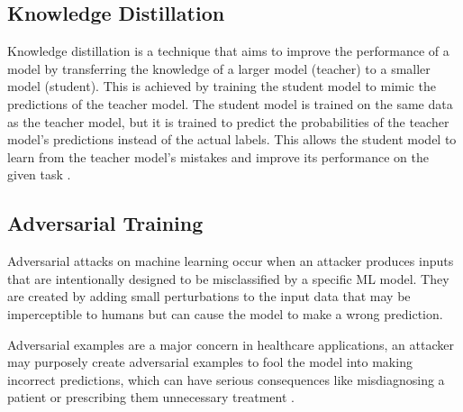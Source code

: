 \documentclass[../main.tex]{subfiles}
\begin{document}
     \subsection{Knowledge Distillation} \label{sec:knowledge_distillation} 

    Knowledge distillation is a technique that aims to improve the performance of a model by transferring the knowledge of a larger model (teacher) to a smaller model (student). This is achieved by training the student model to mimic the predictions of the teacher model. The student model is trained on the same data as the teacher model, but it is trained to predict the probabilities of the teacher model's predictions instead of the actual labels. This allows the student model to learn from the teacher model's mistakes and improve its performance on the given task \cite{hinton_distilling_2015}.
    


    \subsection{Adversarial Training} \label{sec:adversarial_training} 

    Adversarial attacks on machine learning occur when an attacker produces inputs that are intentionally designed to be misclassified by a specific ML model. They are created by adding small perturbations to the input data that may be imperceptible to humans but can cause the model to make a wrong prediction.
    
    Adversarial examples are a major concern in healthcare applications, an attacker may purposely create adversarial examples to fool the model into making incorrect predictions, which can have serious consequences like misdiagnosing a patient or prescribing them unnecessary treatment \cite{finlayson_adversarial_2019}. 
\end{document}
